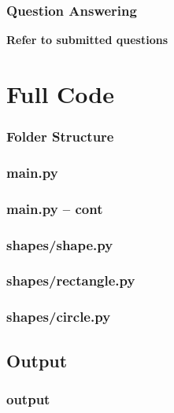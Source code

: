 \documentclass{beamer}
\begin{document}
\begin{frame}
  \frametitle{Question Answering}
  \textbf{Refer to submitted questions}
\end{frame}

\appendix
\section{Full Code}
  \begin{frame}
    \frametitle{Folder Structure}
  \end{frame}

  \begin{frame}
    \frametitle{main.py}
    
  \end{frame}

  \begin{frame}
    \frametitle{main.py -- cont}
    
  \end{frame}

  \begin{frame}
    \frametitle{shapes/shape.py}
    
  \end{frame}

  \begin{frame}
    \frametitle{shapes/rectangle.py}
    
  \end{frame}

  \begin{frame}
    \frametitle{shapes/circle.py}
    
  \end{frame}

\subsection{Output}
  \begin{frame}
    \frametitle{output}
    
  \end{frame}
\end{document}
